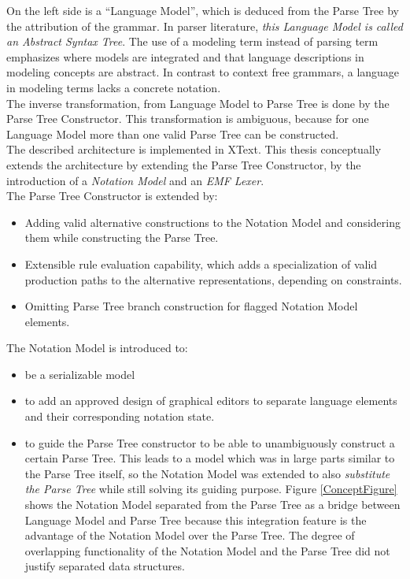 On the left side is a ``Language Model'', which is deduced from the Parse Tree by the attribution of the grammar. In parser literature, \emph{this Language Model is called an Abstract Syntax Tree}. The use of a modeling term instead of parsing term emphasizes where models are integrated and that language descriptions in modeling concepts are abstract. In contrast to context free grammars, a language in modeling terms lacks a concrete notation. \\
The inverse transformation, from Language Model to Parse Tree is done by the Parse Tree Constructor. This transformation is ambiguous, because for one Language Model more than one valid Parse Tree can be constructed. \\
The described architecture is implemented in XText. This thesis conceptually extends the architecture by extending the Parse Tree Constructor, by the introduction of a \emph{Notation Model} and an \emph{EMF Lexer}.\\
The Parse Tree Constructor is extended by:
\begin{itemize}
	\item Adding valid alternative constructions to the Notation Model and considering them while constructing the Parse Tree. 
	\item Extensible rule evaluation capability, which adds a specialization of valid production paths to the alternative representations, depending on constraints. 
	\item Omitting Parse Tree branch construction for flagged Notation Model elements.
\end{itemize}
The Notation Model is introduced to:
\begin{itemize}
	\item be a serializable model
	\item to add an approved design of graphical editors to separate language elements and their corresponding notation state.
	\item to guide the Parse Tree constructor to be able to unambiguously construct a certain Parse Tree. This leads to a model which was in large parts similar to the Parse Tree itself, so the Notation Model was extended to also \emph{substitute the Parse Tree} while still solving its guiding purpose. Figure \ref{ConceptFigure} shows the Notation Model separated from the Parse Tree as a bridge between Language Model and Parse Tree because this integration feature is the advantage of the Notation Model over the Parse Tree. The degree of overlapping functionality of the Notation Model and the Parse Tree did not justify separated data structures.
\end{itemize} 
